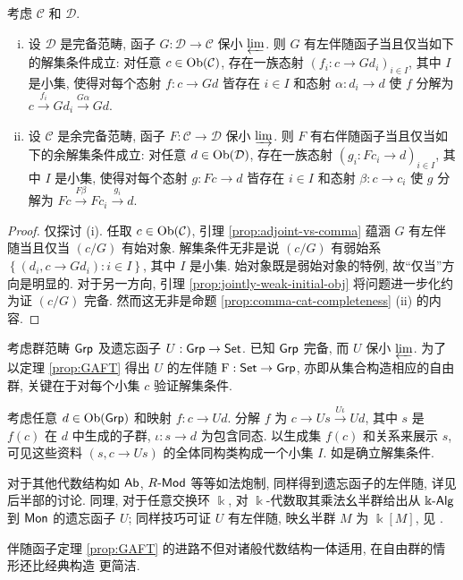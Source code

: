 \begin{theorem}\label{prop:GAFT}
	考虑 $\mathcal{C}$ 和 $\mathcal{D}$.
	\begin{enumerate}[(i)]
		\item 设 $\mathcal{D}$ 是完备范畴, 函子 $G: \mathcal{D} \to \mathcal{C}$ 保小 $\varprojlim$. 则 $G$ 有左伴随函子当且仅当如下的解集条件成立: 对任意 $c \in \operatorname{Ob}(\mathcal{C})$, 存在一族态射 $\left( f_i: c \to Gd_i \right)_{i \in I}$, 其中 $I$ 是小集, 使得对每个态射 $f: c \to Gd$ 皆存在 $i \in I$ 和态射 $\alpha: d_i \to d$ 使 $f$ 分解为 $c \xrightarrow{f_i} Gd_i \xrightarrow{G\alpha} Gd$.
		\item 设 $\mathcal{C}$ 是余完备范畴, 函子 $F: \mathcal{C} \to \mathcal{D}$ 保小 $\varinjlim$. 则 $F$ 有右伴随函子当且仅当如下的余解集条件成立: 对任意 $d \in \operatorname{Ob}(\mathcal{D})$, 存在一族态射 $\left( g_i: Fc_i \to d \right)_{i \in I}$, 其中 $I$ 是小集, 使得对每个态射 $g: Fc \to d$ 皆存在 $i \in I$ 和态射 $\beta: c \to c_i$ 使 $g$ 分解为 $Fc \xrightarrow{F\beta} Fc_i \xrightarrow{g_i} d$.
	\end{enumerate}
\end{theorem}
\begin{proof}
	仅探讨 (i). 任取 $c \in \operatorname{Ob}(\mathcal{C})$, 引理 \ref{prop:adjoint-vs-comma} 蕴涵 $G$ 有左伴随当且仅当 $(c/G)$ 有始对象. 解集条件无非是说 $(c/G)$ 有弱始系 $\left\{ (d_i, c \to Gd_i) : i \in I \right\}$, 其中 $I$ 是小集. 始对象既是弱始对象的特例, 故``仅当''方向是明显的. 对于另一方向, 引理 \ref{prop:jointly-weak-initial-obj} 将问题进一步化约为证 $(c/G)$ 完备. 然而这无非是命题 \ref{prop:comma-cat-completeness} (ii) 的内容.
\end{proof}

\begin{example}\label{eg:free-group-GAFT}
	考虑群范畴 $\mathsf{Grp}$ 及遗忘函子 $U: \mathsf{Grp} \to \mathsf{Set}$. 已知 $\mathsf{Grp}$ 完备, 而 $U$ 保小 $\varprojlim$. 为了以定理 \ref{prop:GAFT} 得出 $U$ 的左伴随 $\mathrm{F}: \mathsf{Set} \to \mathsf{Grp}$, 亦即从集合构造相应的自由群, 关键在于对每个小集 $c$ 验证解集条件.
	
	考虑任意 $d \in \operatorname{Ob}(\mathsf{Grp})$ 和映射 $f: c \to Ud$. 分解 $f$ 为 $c \to Us \xrightarrow{U\iota} Ud$, 其中 $s$ 是 $f(c)$ 在 $d$ 中生成的子群, $\iota: s \to d$ 为包含同态. 以生成集 $f(c)$ 和关系来展示 $s$, 可见这些资料 $(s, c \to Us)$ 的全体同构类构成一个小集 $I$. 如是确立解集条件.
	
	对于其他代数结构如 $\mathsf{Ab}$, $R\text{-}\mathsf{Mod}$ 等等如法炮制, 同样得到遗忘函子的左伴随, 详见 \cite[Chapter V, \S 6]{ML98} 后半部的讨论. 同理, 对于任意交换环 $\Bbbk$, 对 $\Bbbk$-代数取其乘法幺半群给出从 $\Bbbk\text{-}\mathsf{Alg}$ 到 $\mathsf{Mon}$ 的遗忘函子 $U$; 同样技巧可证 $U$ 有左伴随, 映幺半群 $M$ 为 $\Bbbk[M]$, 见 \cite[定义 5.6.1]{Li1}.

	伴随函子定理 \ref{prop:GAFT} 的进路不但对诸般代数结构一体适用, 在自由群的情形还比经典构造 \cite[\S 4.8]{Li1} 更简洁.
\end{example}

